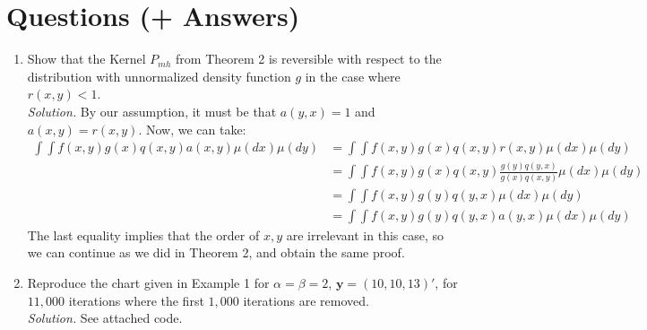 \documentclass[10pt]{article}
\begin{document}
\section{Questions (+ Answers)}
\begin{enumerate}
    \item Show that the Kernel $P_{mh}$ from Theorem 2 is reversible with respect to the distribution with unnormalized density function $g$ in the case where $r \left( x, y \right) < 1$.
    \\[1\baselineskip]
    \textit{Solution.} By our assumption, it must be that $a \left( y, x \right) = 1$ and $a \left( x, y \right) = r \left( x, y \right)$. Now, we can take:
    \begin{align*}
    \int \int f \left( x, y \right) g \left( x \right) q \left( x, y \right) a \left( x, y \right) \mu \left( dx \right) \mu \left( dy \right) &= \int \int f \left( x, y \right) g \left( x \right) q \left( x, y \right) r \left( x,y \right) \mu \left( dx \right) \mu \left( dy \right) \\[1em]
    &= \int \int f \left( x, y \right) g \left( x \right) q \left( x, y \right) \frac{g \left( y \right) q \left( y, x \right)}{g \left( x \right) q \left( x, y \right)} \mu \left( dx \right) \mu \left( dy \right) \\[1em]
    &= \int \int f \left( x, y \right) g \left( y \right) q \left( y, x \right)  \mu \left( dx \right) \mu \left( dy \right) \\[1em]
    &= \int \int f \left( x, y \right) g \left( y \right) q \left( y, x \right) a \left( y, x \right) \mu \left( dx \right) \mu \left( dy \right)
    \end{align*}
    The last equality implies that the order of $x, y$ are irrelevant in this case, so we can continue as we did in Theorem 2, and obtain the same proof.

    \item Reproduce the chart given in Example 1 for $\alpha = \beta = 2$, $\mathbf{y} = \left( 10, 10, 13 \right)'$, for $11,000$ iterations where the first $1,000$ iterations are removed.
    \\[1\baselineskip]
    \textit{Solution.} See attached code.
\end{enumerate}






\clearpage
\appendix





\printbibliography
\end{document}

